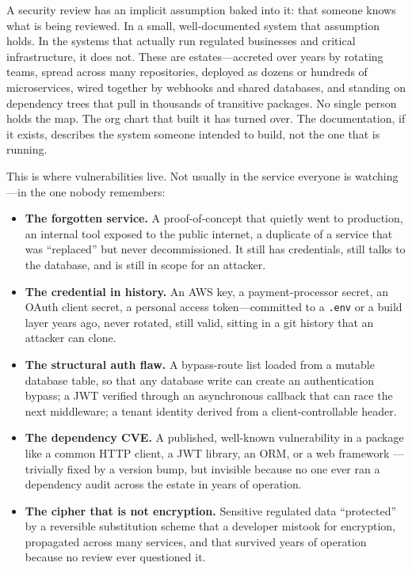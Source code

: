 \documentclass[11pt,letterpaper]{article}
\begin{document}
A security review has an implicit assumption baked into it: that someone knows
what is being reviewed. In a small, well-documented system that assumption holds.
In the systems that actually run regulated businesses and critical
infrastructure, it does not. These are estates---accreted over years by rotating
teams, spread across many repositories, deployed as dozens or hundreds of
microservices, wired together by webhooks and shared databases, and standing on
dependency trees that pull in thousands of transitive packages. No single person
holds the map. The org chart that built it has turned over. The documentation, if
it exists, describes the system someone intended to build, not the one that is
running.

This is where vulnerabilities live. Not usually in the service everyone is
watching---in the one nobody remembers:

\begin{itemize}
  \item \textbf{The forgotten service.} A proof-of-concept that quietly went to
  production, an internal tool exposed to the public internet, a duplicate of a
  service that was ``replaced'' but never decommissioned. It still has
  credentials, still talks to the database, and is still in scope for an attacker.
  \item \textbf{The credential in history.} An AWS key, a payment-processor
  secret, an OAuth client secret, a personal access token---committed to a
  \texttt{.env} or a build layer years ago, never rotated, still valid, sitting in
  a git history that an attacker can clone.
  \item \textbf{The structural auth flaw.} A bypass-route list loaded from a
  mutable database table, so that any database write can create an authentication
  bypass; a JWT verified through an asynchronous callback that can race the next
  middleware; a tenant identity derived from a client-controllable header.
  \item \textbf{The dependency CVE.} A published, well-known vulnerability in a
  package like a common HTTP client, a JWT library, an ORM, or a web framework
  ---trivially fixed by a version bump, but invisible because no one ever ran a
  dependency audit across the estate in years of operation.
  \item \textbf{The cipher that is not encryption.} Sensitive regulated data
  ``protected'' by a reversible substitution scheme that a developer mistook for
  encryption, propagated across many services, and that survived years of
  operation because no review ever questioned it.
\end{itemize}
\end{document}
